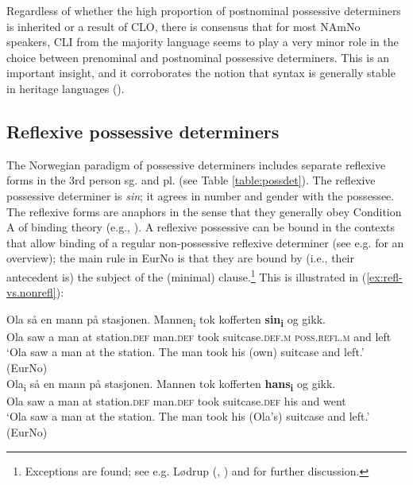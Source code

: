 \documentclass[output=paper,colorlinks,citecolor=brown]{langscibook}
\begin{document}
Regardless of whether the high proportion of postnominal possessive determiners is inherited or a result of CLO, there is consensus that for most NAmNo speakers, CLI from the majority language seems to play a very minor role  in the choice between prenominal and postnominal possessive determiners.  This is an important insight, and it corroborates the notion that syntax is generally stable in heritage languages (\citealt{benmamounetal2013hls, lohndaletal2019hlacquisition}). 






\subsection{Reflexive possessive determiners}\label{subsec:reflexive}
\largerpage



 The Norwegian paradigm of possessive determiners includes separate reflexive forms in the 3rd person sg. and pl. (see Table \ref{table:possdet}). 
The reflexive possessive determiner is \emph{sin}; it agrees in number and gender with the possessee. The reflexive forms are anaphors in the sense that they generally obey Condition A of  binding theory (e.g., \citealt[95]{chomsky1995minimalist}). A reflexive possessive can be bound in the contexts that allow binding of a regular non-possessive reflexive determiner (see e.g. \citealt[chap. 9]{faarlund2019syntax} for an overview); the main rule in EurNo is that they are bound by (i.e., their antecedent is) the subject of the (minimal) clause.\footnote{Exceptions are found; see e.g. Lødrup (\citeyear{lodrup2008objectsbinding}, \citeyear{lodrup2009animacyandlongdistancebinding}) and \citet{julien2020langdistansebinding} for further discussion.} This is illustrated in (\ref{ex:refl-vs.nonrefl}):


\ea \label{ex:refl-vs.nonrefl}
\ea \gll Ola så en mann på stasjonen. Mannen\textsubscript{i} tok kofferten \textbf{sin\textsubscript{i}} og gikk. \\
Ola saw a man at station.\textsc{def} man.\textsc{def} took suitcase.\textsc{def.m} \textsc{poss.refl.m} and left 
\\
\glt `Ola saw a man at the station. The man took his (own) suitcase and left.' (EurNo)\\
\ex \gll Ola\textsubscript{i} så en mann på stasjonen. Mannen tok kofferten \textbf{hans\textsubscript{i}} og gikk.\\
Ola saw a man at station.\textsc{def} man.\textsc{def} took suitcase.\textsc{def} his and went\\
\glt `Ola saw a man at the station. The man took his (Ola's) suitcase and left.' (EurNo) \\
\z 
\z 
\end{document}
